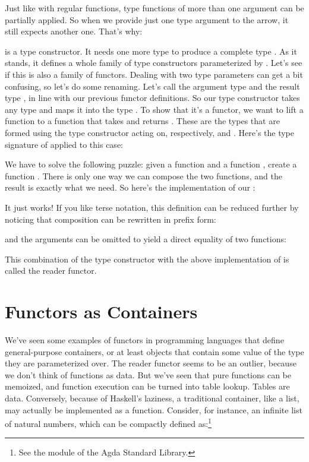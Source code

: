 Just like with regular functions, type functions of more than one
argument can be partially applied. So when we provide just one type
argument to the arrow, it still expects another one. That's why:

is a type constructor. It needs one more type  to produce a
complete type . As it stands, it defines a
whole family of type constructors parameterized by . Let's see
if this is also a family of functors. Dealing with two type parameters
can get a bit confusing, so let's do some renaming. Let's call the
argument type  and the result type , in line with
our previous functor definitions. So our type constructor takes any type
 and maps it into the type . To show
that it's a functor, we want to lift a function
 to a function that takes
 and returns . These
are the types that are formed using the type constructor
 acting on, respectively,  and
. Here's the type signature of  applied to this
case:

We have to solve the following puzzle: given a function
 and a function
, create a function
. There is only one way we can compose the two
functions, and the result is exactly what we need. So here's the
implementation of our :

It just works! If you like terse notation, this definition can be
reduced further by noticing that composition can be rewritten in prefix
form:

and the arguments can be omitted to yield a direct equality of two
functions:

This combination of the type constructor 
with the above implementation of  is called the reader
functor.

\section{Functors as Containers}

We've seen some examples of functors in programming languages that
define general-purpose containers, or at least objects that contain some
value of the type they are parameterized over. The reader functor seems
to be an outlier, because we don't think of functions as data. But we've
seen that pure functions can be memoized, and function execution can be
turned into table lookup. Tables are data. Conversely, because of
Haskell's laziness, a traditional container, like a list, may actually
be implemented as a function. Consider, for instance, an infinite list
of natural numbers, which can be compactly defined as:\footnote{%
  See the  module of the Agda Standard Library.}

